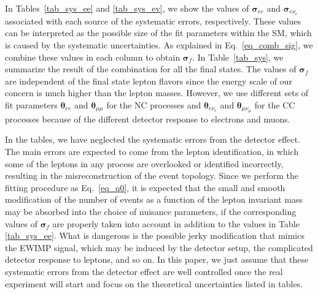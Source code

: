 \documentclass[12pt, a4paper]{article}
\begin{document}
In Tables~\ref{tab_sys_ee} and \ref{tab_sys_ev}, we show the values of
$\bm{\sigma}_{ee}$ and $\bm{\sigma}_{e\nu_e}$ associated with each
source of the systematic errors, respectively.  These values can be
interpreted as the possible size of the fit parameters within the SM,
which is caused by the systematic uncertainties.  As explained in
Eq.~\eqref{eq_comb_sig}, we combine these values in each column to
obtain $\bm{\sigma}_f$.  In Table~\ref{tab_sys}, we summarize the
result of the combination for all the final states.  The values of
$\bm{\sigma}_f$ are independent of the final state lepton flavors
since the energy scale of our concern is much higher than the lepton
masses.  However, we use different sets of fit parameters
$\bm{\theta}_{ee}$ and $\bm{\theta}_{\mu\mu}$ for the NC processes and
$\bm{\theta}_{e\nu_e}$ and $\bm{\theta}_{\mu\nu_\mu}$ for the CC
processes because of the different detector response to electrons and
muons.

In the tables, we have neglected the systematic errors from the
detector effect.  The main errors are expected to come from the lepton
identification, in which some of the leptons in any process are
overlooked or identified incorrectly, resulting in the
misreconstruction of the event topology.  Since we perform the fitting
procedure as Eq.~\eqref{eq_q0}, it is expected that the small and
smooth modification of the number of events as a function of the
lepton invariant mass may be absorbed into the choice of nuisance
parameters, if the corresponding values of $\bm{\sigma}_f$ are
properly taken into account in addition to the values in Table
\ref{tab_sys_ee}.  What is dangerous is the possible jerky
modification that mimics the EWIMP signal, which may be induced by the
detector setup, the complicated detector response to leptons, and so
on.  %
In this paper, we just assume that these systematic
errors from the detector effect are well controlled once the real
experiment will start and focus on the theoretical uncertainties
listed in tables.

\end{document}
